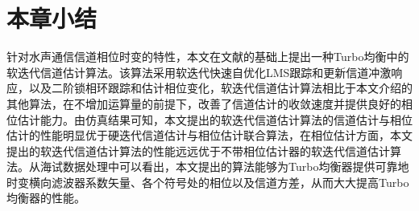 \section{本章小结}
针对水声通信信道相位时变的特性，本文在文献的基础上提出一种Turbo均衡中的软迭代信道估计算法。该算法采用软迭代快速自优化LMS跟踪和更新信道冲激响应，以及二阶锁相环跟踪和估计相位变化，软迭代信道估计算法相比于本文介绍的其他算法，在不增加运算量的前提下，改善了信道估计的收敛速度并提供良好的相位估计能力。由仿真结果可知，本文提出的软迭代信道估计算法的信道估计与相位估计的性能明显优于硬迭代信道估计与相位估计联合算法，在相位估计方面，本文提出的软迭代信道估计算法的性能远远优于不带相位估计器的软迭代信道估计算法。从海试数据处理中可以看出，本文提出的算法能够为Turbo均衡器提供可靠地时变横向滤波器系数矢量、各个符号处的相位以及信道方差，从而大大提高Turbo均衡器的性能。
%
\clearpage{\pagestyle{empty}\cleardoublepage}
